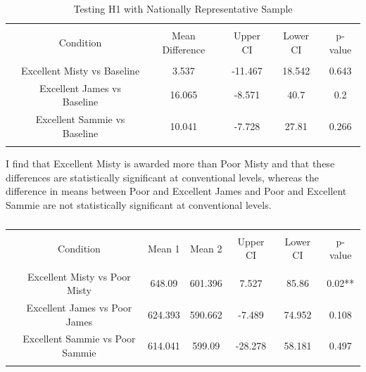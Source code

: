 \documentclass[12pt]{article}%
\begin{document}
\begin{doublespace}
\begin{table}[!htbp] \centering 
	\caption{Testing H1 with Nationally Representative Sample} 
	\label{} 
	\footnotesize 
	\begin{tabular}{@{\extracolsep{1pt}} cccccc} 
		\\[-1.8ex]\hline \\[-1.8ex] 
		& Condition & Mean Difference & Upper CI & Lower CI & p-value \\ 
		\hline \\[-1.8ex] 
		& Excellent Misty vs Baseline & 3.537 & -11.467 & 18.542 & 0.643 \\ 
		& Excellent James vs Baseline & 16.065 & -8.571 & 40.7 & 0.2 \\ 
		& Excellent Sammie vs Baseline & 10.041 & -7.728 & 27.81 & 0.266 \\ 
		\hline \\[-1.8ex] 
	\end{tabular} 
\end{table} 

I find that Excellent Misty is awarded more than Poor Misty and that these differences are statistically significant at conventional levels, whereas the difference in means between Poor and Excellent James and Poor and Excellent Sammie are not statistically significant at conventional levels.

\begin{table}[!htbp] \centering 
	\caption{} 
	\label{} 
	\footnotesize 
	\begin{tabular}{@{\extracolsep{1pt}} ccccccc} 
		\\[-1.8ex]\hline \\[-1.8ex] 
		& Condition & Mean 1 & Mean 2 & Upper CI & Lower CI & p-value \\ 
		\hline \\[-1.8ex] 
		& Excellent Misty vs Poor Misty & 648.09 & 601.396 & 7.527 & 85.86 & 0.02** \\ 
		& Excellent James vs Poor James & 624.393 & 590.662 & -7.489 & 74.952 & 0.108 \\ 
		& Excellent Sammie vs Poor Sammie & 614.041 & 599.09 & -28.278 & 58.181 & 0.497 \\ 
		\hline \\[-1.8ex] 
	\end{tabular} 
\end{table} 




\end{doublespace}
\end{document}
